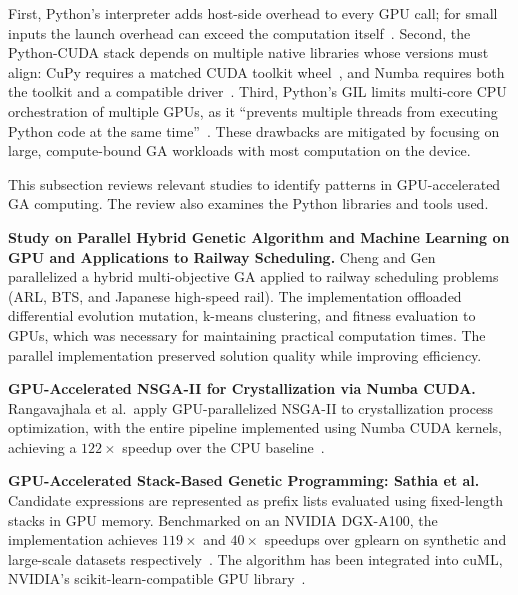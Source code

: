 First, Python's interpreter adds host-side overhead to every GPU call; for small inputs the launch overhead can exceed the computation itself~\cite{carpentries_gpu}. Second, the Python-CUDA stack depends on multiple native libraries whose versions must align: CuPy requires a matched CUDA toolkit wheel~\cite{cupy_install}, and Numba requires both the toolkit and a compatible driver~\cite{numba_cuda}. Third, Python's GIL limits multi-core CPU orchestration of multiple GPUs, as it ``prevents multiple threads from executing Python code at the same time''~\cite{pep703}. These drawbacks are mitigated by focusing on large, compute-bound GA workloads with most computation on the device.




This subsection reviews relevant studies to identify patterns in GPU-accelerated GA computing. The review also examines the Python libraries and tools used.

\textbf{Study on Parallel Hybrid Genetic Algorithm and Machine Learning on GPU and Applications to Railway Scheduling.} Cheng and Gen~\cite{cheng2020parallel} parallelized a hybrid multi-objective GA applied to railway scheduling problems (ARL, BTS, and Japanese high-speed rail). The implementation offloaded differential evolution mutation, k-means clustering, and fitness evaluation to GPUs, which was necessary for maintaining practical computation times. The parallel implementation preserved solution quality while improving efficiency.

\textbf{GPU-Accelerated NSGA-II for Crystallization via Numba CUDA.} Rangavajhala et al.\ apply GPU-parallelized NSGA-II to crystallization process optimization, with the entire pipeline implemented using Numba CUDA kernels, achieving a $122\times$ speedup over the CPU baseline~\cite{rangavajhala2024accelerating}.

\textbf{GPU-Accelerated Stack-Based Genetic Programming: Sathia et al.} Candidate expressions are represented as prefix lists evaluated using fixed-length stacks in GPU memory. Benchmarked on an NVIDIA DGX-A100, the implementation achieves $119\times$ and $40\times$ speedups over gplearn on synthetic and large-scale datasets respectively~\cite{sathia2021accelerating}. The algorithm has been integrated into cuML, NVIDIA's scikit-learn-compatible GPU library~\cite{sathia2021accelerating}.

